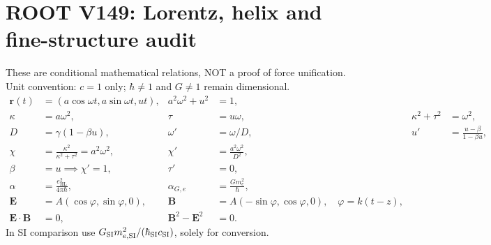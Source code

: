 \documentclass[11pt]{article}
\begin{document}
\section*{ROOT V149: Lorentz, helix and fine-structure audit}
\noindent These are conditional mathematical relations, NOT a proof of force unification.\\
Unit convention: $c=1$ only; $\hbar\ne 1$ and $G\ne 1$ remain dimensional.
\begin{align}
\boldsymbol r(t)&=(a\cos\omega t,a\sin\omega t,ut),&a^2\omega^2+u^2&=1,\\
\kappa&=a\omega^2,&\tau&=u\omega,&\kappa^2+\tau^2&=\omega^2,\\
D&=\gamma(1-\beta u),&\omega'&=\omega/D,&u'&=\frac{u-\beta}{1-\beta u},\\
\chi&=\frac{\kappa^2}{\kappa^2+\tau^2}=a^2\omega^2,&\chi'&=\frac{a^2\omega^2}{D^2},\\
\beta&=u\implies\chi'=1,&\tau'&=0,\\
\alpha&=\frac{e_{\mathrm{HL}}^2}{4\pi\hbar},&\alpha_{G,e}&=\frac{Gm_e^2}{\hbar},\\
\boldsymbol E&=A(\cos\varphi,\sin\varphi,0),&
\boldsymbol B&=A(-\sin\varphi,\cos\varphi,0),\quad\varphi=k(t-z),\\
\boldsymbol E\cdot\boldsymbol B&=0,&\boldsymbol B^2-\boldsymbol E^2&=0.
\end{align}
\noindent In SI comparison use $G_{\rm SI}m_{e,\rm SI}^2/(\hbar_{\rm SI}c_{\rm SI})$, solely for conversion.
\end{document}
